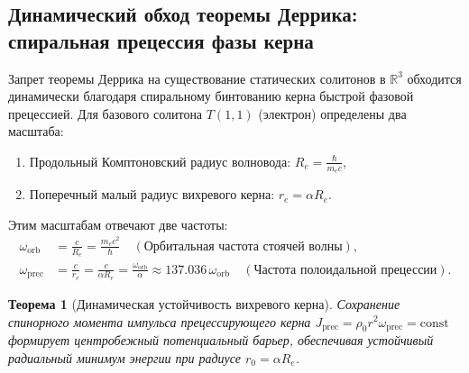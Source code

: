 \documentclass[11pt,a4paper]{article}
\newtheorem{theorem}{Теорема}[section]
\theoremstyle{definition}
\theoremstyle{remark}
\begin{document}
\subsection{Динамический обход теоремы Деррика: спиральная прецессия фазы керна}
Запрет теоремы Деррика на существование статических солитонов в $\mathbb{R}^3$ обходится динамически благодаря спиральному бинтованию керна быстрой фазовой прецессией. Для базового солитона $T(1,1)$ (электрон) определены два масштаба:
\begin{enumerate}
    \item Продольный Комптоновский радиус волновода: $R_e = \frac{\hbar}{m_e c}$,
    \item Поперечный малый радиус вихревого керна: $r_e = \alpha R_e$.
\end{enumerate}
Этим масштабам отвечают две частоты:
\begin{align}
    \omega_{\mathrm{orb}} &= \frac{c}{R_e} = \frac{m_e c^2}{\hbar} \quad (\text{Орбитальная частота стоячей волны}), \\
    \omega_{\mathrm{prec}} &= \frac{c}{r_e} = \frac{c}{\alpha R_e} = \frac{\omega_{\mathrm{orb}}}{\alpha} \approx 137.036 \, \omega_{\mathrm{orb}} \quad (\text{Частота полоидальной прецессии}).
\end{align}

\begin{theorem}[Динамическая устойчивость вихревого керна]
Сохранение спинорного момента импульса прецессирующего керна $J_{\mathrm{prec}} = \rho_0 r^2 \omega_{\mathrm{prec}} = \mathrm{const}$ формирует центробежный потенциальный барьер, обеспечивая устойчивый радиальный минимум энергии при радиусе $r_0 = \alpha R_e$.
\end{theorem}
\end{document}

